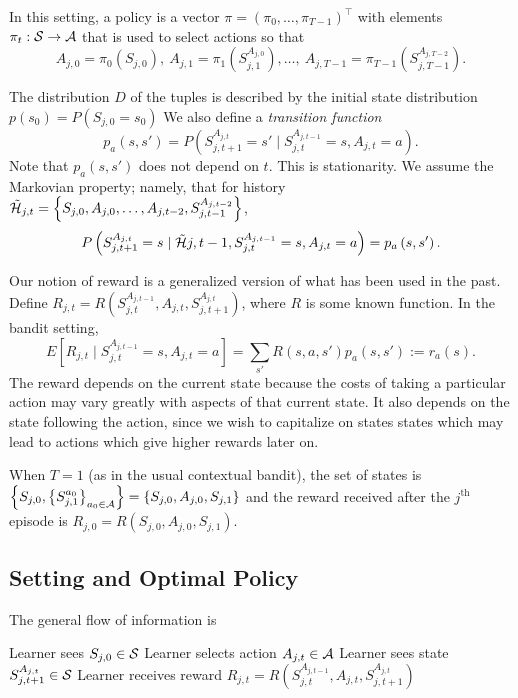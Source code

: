 \documentclass[11pt]{article}
\begin{document}
In this setting, a policy is a vector $\pi = \left(\pi_{0}, \ldots, \pi_{T-1}\right)^\top$ with elements $\pi_{t}: \mathcal{S}\to\mathcal{A}$ that is used to select actions so that
\[
	A_{j,0} = \pi_{0}\left(S_{j,0}\right), \ A_{j,1} = \pi_{1}\left(S_{j,1}^{A_{j,0}}\right), \ldots, \ A_{j,T-1} = \pi_{T-1}\left(S_{j,T-1}^{A_{j,T-2}}\right).
\]

The distribution $D$ of the tuples is described by the initial state distribution $p(s_{0}) = P\left(S_{j,0}=s_{0}\right)$ We also define a \textit{transition function}
\[
	p_{a}\left(s, s'\right) = P\left(S_{j,t+1}^{A_{j,t}} = s' \mid S_{j,t}^{A_{j,t-1}} = s, A_{j,t} = a\right).
\]
Note that $p_{a}(s,s')$ does not depend on $t$. This is stationarity. We assume the Markovian property; namely, that for history $\tilde{\mathcal{H}}_{j,t} = \left\{S_{j,0}, A_{j,0}, \ldots, A_{j,t-2}, S_{j,t-1}^{A_{j,t-2}}\right\}$, 
\[
	P\left(S_{j,t+1}^{A_{j,t}} =s \mid \tilde{\mathcal{H}}{j,t-1}, S_{j,t}^{A_{j,t-1}} = s, A_{j,t} = a\right) = p_{a}\left(s,s'\right).
\]

Our notion of reward is a generalized version of what has been used in the past. Define $R_{j,t} = R\left(S_{j, t}^{A_{j,t-1}}, A_{j,t}, S_{j,t+1}^{A_{j,t}}\right)$, where $R$ is some known function. In the bandit setting,
\[
	E\left[R_{j,t}\mid S_{j,t}^{A_{j,t-1}} = s, A_{j,t} = a\right] = \sum_{s'} R(s, a, s') p_{a}(s,s') := r_{a}(s). 
\]
The reward depends on the current state because the costs of taking a particular action may vary greatly with aspects of that current state. It also depends on the state following the action, since we wish to capitalize on states states which may lead to actions which give higher rewards later on.

When $T = 1$ (as in the usual contextual bandit), the set of states is $\left\{S_{j,0}, \left\{S_{j,1}^{a_{0}}\right\}_{a_{0}\in\mathcal{A}}\right\} = \left\{S_{j,0}, A_{j,0}, S_{j,1}\right\}$ and the reward received after the $j^{\text{th}}$ episode is $R_{j,0} = R\left(S_{j,0}, A_{j,0}, S_{j,1}\right)$.

\subsection{Setting and Optimal Policy}
The general flow of information is 
\begin{algorithmic}[1]
	\STATE Learner sees $S_{j,0}\in \mathcal{S}$
	\STATE Learner selects action $A_{j,t}\in\mathcal{A}$
	\STATE Learner sees state $S_{j,t+1}^{A_{j,t}} \in \mathcal{S}$
	\STATE Learner receives reward $R_{j,t} = R\left(S_{j,t}^{A_{j,t-1}}, A_{j,t}, S_{j,t+1}^{A_{j,t}}\right)$
	\ENDFOR
	\ENDFOR
\end{algorithmic}
\end{document}
